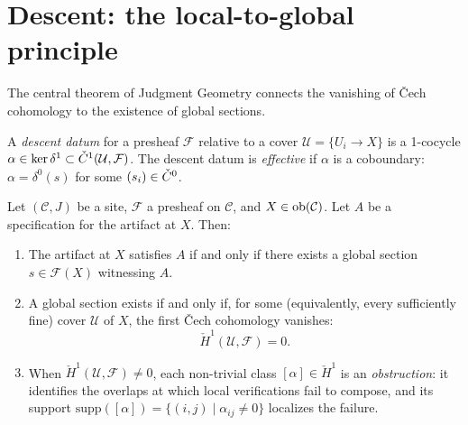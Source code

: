 \section{Descent: the local-to-global principle}
\label{sec:cech:descent}

The central theorem of Judgment Geometry connects the vanishing of
\v{C}ech cohomology to the existence of global sections.

\begin{definition}
\label{def:descent-datum}
A \emph{descent datum} for a presheaf $\mathcal{F}$ relative to a
cover $\mathcal{U} = \{U_i \to X\}$ is a 1-cocycle
$\alpha \in \ker \delta^1 \subset \check{C}^1(\mathcal{U}, \mathcal{F})$.
The descent datum is \emph{effective} if $\alpha$ is a coboundary:
$\alpha = \delta^0(s)$ for some $(s_i) \in \check{C}^0$.
\end{definition}

\begin{theorem}
\label{thm:fundamental}
Let $(\mathcal{C}, J)$ be a site, $\mathcal{F}$ a presheaf on
$\mathcal{C}$, and $X \in \mathrm{ob}(\mathcal{C})$.  Let $A$ be a
specification for the artifact at $X$.  Then:

\begin{enumerate}
\item The artifact at $X$ satisfies $A$ if and only if there exists a
  global section $s \in \mathcal{F}(X)$ witnessing $A$.

\item A global section exists if and only if, for some (equivalently,
  every sufficiently fine) cover $\mathcal{U}$ of $X$, the first
  \v{C}ech cohomology vanishes:
  \[
    \check{H}^1(\mathcal{U}, \mathcal{F}) = 0.
  \]

\item When $\check{H}^1(\mathcal{U}, \mathcal{F}) \neq 0$, each
  non-trivial class $[{\alpha}] \in \check{H}^1$ is an
  \emph{obstruction}: it identifies the overlaps at which local
  verifications fail to compose, and its support
  $\mathrm{supp}([\alpha]) = \{(i,j) \mid \alpha_{ij} \neq 0\}$
  localizes the failure.
\end{enumerate}
\end{theorem}

